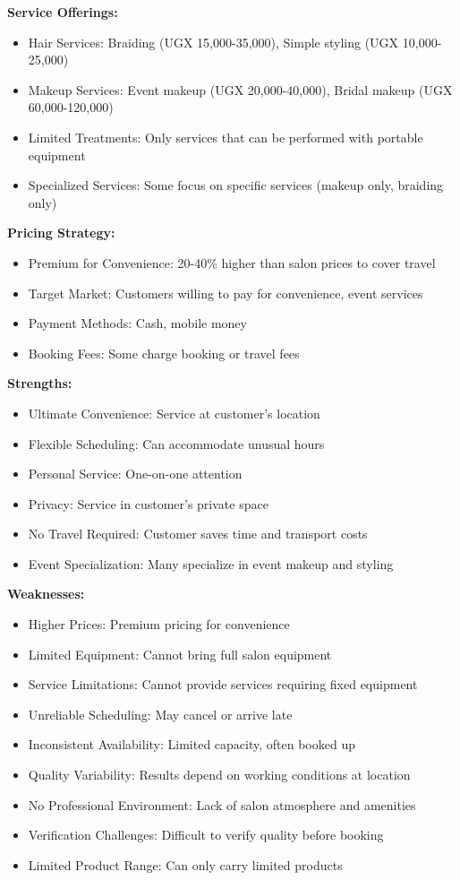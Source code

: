 \documentclass[a4paper,12pt]{article}
\begin{document}
\textbf{Service Offerings:}
\begin{itemize}[leftmargin=2em]
    \item Hair Services: Braiding (UGX 15,000-35,000), Simple styling (UGX 10,000-25,000)
    \item Makeup Services: Event makeup (UGX 20,000-40,000), Bridal makeup (UGX 60,000-120,000)
    \item Limited Treatments: Only services that can be performed with portable equipment
    \item Specialized Services: Some focus on specific services (makeup only, braiding only)
\end{itemize}

\textbf{Pricing Strategy:}
\begin{itemize}[leftmargin=2em]
    \item Premium for Convenience: 20-40\% higher than salon prices to cover travel
    \item Target Market: Customers willing to pay for convenience, event services
    \item Payment Methods: Cash, mobile money
    \item Booking Fees: Some charge booking or travel fees
\end{itemize}

\textbf{Strengths:}
\begin{itemize}[leftmargin=2em]
    \item Ultimate Convenience: Service at customer's location
    \item Flexible Scheduling: Can accommodate unusual hours
    \item Personal Service: One-on-one attention
    \item Privacy: Service in customer's private space
    \item No Travel Required: Customer saves time and transport costs
    \item Event Specialization: Many specialize in event makeup and styling
\end{itemize}

\textbf{Weaknesses:}
\begin{itemize}[leftmargin=2em]
    \item Higher Prices: Premium pricing for convenience
    \item Limited Equipment: Cannot bring full salon equipment
    \item Service Limitations: Cannot provide services requiring fixed equipment
    \item Unreliable Scheduling: May cancel or arrive late
    \item Inconsistent Availability: Limited capacity, often booked up
    \item Quality Variability: Results depend on working conditions at location
    \item No Professional Environment: Lack of salon atmosphere and amenities
    \item Verification Challenges: Difficult to verify quality before booking
    \item Limited Product Range: Can only carry limited products
\end{itemize}
\end{document}
